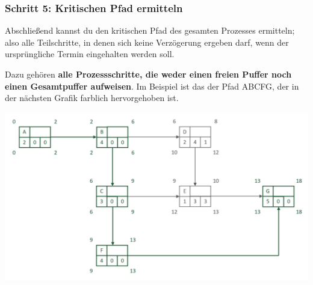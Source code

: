\subsubsection{Schritt 5: Kritischen Pfad ermitteln}

Abschließend kannst du den kritischen Pfad des gesamten Prozesses ermitteln; also alle Teilschritte, in denen sich keine Verzögerung ergeben darf, wenn der ursprüngliche Termin eingehalten werden soll.

Dazu gehören \textbf{alle Prozessschritte, die weder einen freien Puffer noch einen Gesamtpuffer aufweisen}. Im Beispiel ist das der Pfad ABCFG, der in der nächsten Grafik farblich hervorgehoben ist.

\begin{center}
	\includegraphics[width=\textwidth]{Bilder/Netzplan/Netzplan5.png}
\end{center}